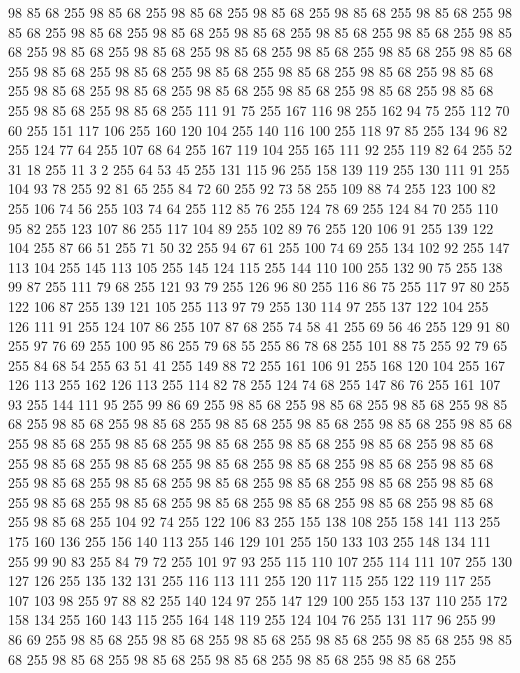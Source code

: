 98 85 68 255 98 85 68 255 98 85 68 255 98 85 68 255 98 85 68 255 98 85 68 255 98 85 68 255 98 85 68 255 98 85 68 255 98 85 68 255 98 85 68 255 98 85 68 255 98 85 68 255 98 85 68 255 98 85 68 255 98 85 68 255 98 85 68 255 98 85 68 255 98 85 68 255 98 85 68 255 98 85 68 255 98 85 68 255 98 85 68 255 98 85 68 255 98 85 68 255 98 85 68 255 98 85 68 255 98 85 68 255 98 85 68 255 98 85 68 255 98 85 68 255 98 85 68 255 98 85 68 255 111 91 75 255 167 116 98 255 162 94 75 255 112 70 60 255 151 117 106 255 160 120 104 255 140 116 100 255 118 97 85 255 134 96 82 255 124 77 64 255 107 68 64 255 167 119 104 255 165 111 92 255 119 82 64 255 52 31 18 255 11 3 2 255 64 53 45 255 131 115 96 255 158 139 119 255 130 111 91 255 104 93 78 255 92 81 65 255 84 72 60 255 92 73 58 255 109 88 74 255 123 100 82 255 106 74 56 255 103 74 64 255 112 85 76 255 124 78 69 255 124 84 70 255
110 95 82 255 123 107 86 255 117 104 89 255 102 89 76 255 120 106 91 255 139 122 104 255 87 66 51 255 71 50 32 255 94 67 61 255 100 74 69 255 134 102 92 255 147 113 104 255 145 113 105 255 145 124 115 255 144 110 100 255 132 90 75 255 138 99 87 255 111 79 68 255 121 93 79 255 126 96 80 255 116 86 75 255 117 97 80 255 122 106 87 255 139 121 105 255 113 97 79 255 130 114 97 255 137 122 104 255 126 111 91 255 124 107 86 255 107 87 68 255 74 58 41 255 69 56 46 255 129 91 80 255 97 76 69 255 100 95 86 255 79 68 55 255 86 78 68 255 101 88 75 255 92 79 65 255 84 68 54 255 63 51 41 255 149 88 72 255 161 106 91 255 168 120 104 255 167 126 113 255 162 126 113 255 114 82 78 255 124 74 68 255 147 86 76 255 161 107 93 255 144 111 95 255 99 86 69 255 98 85 68 255 98 85 68 255 98 85 68 255 98 85 68 255 98 85 68 255 98 85 68 255 98 85 68 255 98 85 68 255 98 85 68 255 98 85 68 255 98 85 68 255 98 85 68 255
98 85 68 255 98 85 68 255 98 85 68 255 98 85 68 255 98 85 68 255 98 85 68 255 98 85 68 255 98 85 68 255 98 85 68 255 98 85 68 255 98 85 68 255 98 85 68 255 98 85 68 255 98 85 68 255 98 85 68 255 98 85 68 255 98 85 68 255 98 85 68 255 98 85 68 255 98 85 68 255 98 85 68 255 98 85 68 255 98 85 68 255 104 92 74 255 122 106 83 255 155 138 108 255 158 141 113 255 175 160 136 255 156 140 113 255 146 129 101 255 150 133 103 255 148 134 111 255 99 90 83 255 84 79 72 255 101 97 93 255 115 110 107 255 114 111 107 255 130 127 126 255 135 132 131 255 116 113 111 255 120 117 115 255 122 119 117 255 107 103 98 255 97 88 82 255 140 124 97 255 147 129 100 255 153 137 110 255 172 158 134 255 160 143 115 255 164 148 119 255 124 104 76 255 131 117 96 255 99 86 69 255 98 85 68 255 98 85 68 255 98 85 68 255 98 85 68 255 98 85 68 255 98 85 68 255 98 85 68 255 98 85 68 255 98 85 68 255 98 85 68 255 98 85 68 255
